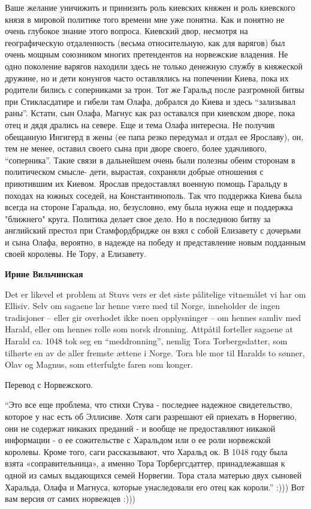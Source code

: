 \begin{itemize}
\begin{itemize}
\begin{itemize}
Ваше желание уничижить и принизить роль киевских княжен и роль киевского князя
в мировой политике того времени мне уже понятна. Как и понятно не очень
глубокое знание этого вопроса. Киевский двор, несмотря на географическую
отдаленность (весьма относительную, как для варягов) был очень мощным союзником
многих претендентов на норвежские владения. Не одно поколение варягов находили
здесь не только денежную службу в княжеской дружине, но и дети конунгов часто
оставлялись на попечении Киева, пока их родители бились с соперниками за трон.
Тот же Гаральд после разгромной битвы при Стикласдатире и гибели там Олафа,
добрался до Киева и здесь \enquote{зализывал раны}. Кстати, сын Олафа, Магнус как раз
оставался при киевском дворе, пока отец и дядя дрались на севере. Еще и тема
Олафа интересна. Не получив обещанную Ингигерд в жены (ее папа резко передумал
и отдал ее Ярославу), он, тем не менее, оставил своего сына при дворе своего,
более удачливого, \enquote{соперника}. Такие связи в дальнейшем очень были полезны обеим
сторонам в политическом смысле- дети, вырастая, сохраняли добрые отношения с
приютившим их Киевом. Ярослав предоставлял военную помощь Гаральду в походах на
южных соседей, на Константинополь. Так что поддержка Киева была всегда на
стороне Гаральда, но, безусловно, ему была нужна еще и поддержка "ближнего"
круга. Политика делает свое дело. Но в последнюю битву за английский престол
при Стамфордбридже он взял с собой Елизавету с дочерьми и сына Олафа, вероятно,
в надежде на победу и представление новым подданным своей королевы. Не Тору, а
Елизавету.

\textbf{Ирине Вильчинская} 

Det er likevel et problem at Stuvs vers er det siste pålitelige vitnemålet vi
har om Ellisiv. Selv om sagaene lar henne være med til Norge, inneholder de
ingen tradisjoner – eller gir overhodet ikke noen opplysninger – om hennes
samliv med Harald, eller om hennes rolle som norsk dronning. Attpåtil forteller
sagaene at Harald ca. 1048 tok seg en \enquote{meddronning}, nemlig Tora
Torbergsdatter, som tilhørte en av de aller fremste ættene i Norge. Tora ble
mor til Haralds to sønner, Olav og Magnus, som etterfulgte faren som konger.

Перевод с Норвежского. 

\enquote{Это все еще проблема, что стихи Стува - последнее надежное
свидетельство, которое у нас есть об Эллисиве. Хотя саги разрешают ей приехать
в Норвегию, они не содержат никаких преданий - и вообще не предоставляют
никакой информации - о ее сожительстве с Харальдом или о ее роли норвежской
королевы. Кроме того, саги рассказывают, что Харальд ок. В 1048 году была взята
«соправительница», а именно Тора Торбергсдаттер, принадлежавшая к одной из
самых выдающихся семей Норвегии. Тора стала матерью двух сыновей Харальда,
Олафа и Магнуса, которые унаследовали его отец как короли.} :))) Вот вам версия
от самих норвежцев :)))


\end{itemize}
\end{itemize}
\end{itemize}
